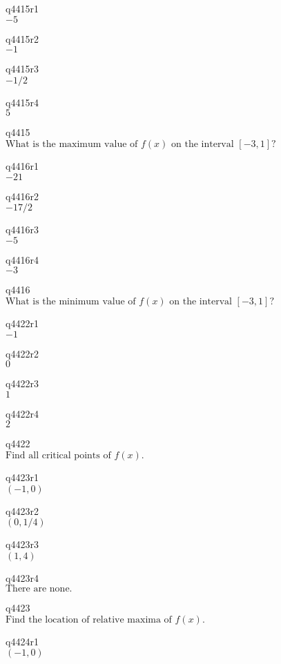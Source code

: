 q4415r1\\
\(\displaystyle -5 \)

q4415r2\\
\(\displaystyle -1 \)

q4415r3\\
\(\displaystyle -1/2 \)

q4415r4\\
\(\displaystyle 5 \)

q4415\\
\(\displaystyle \text{What is the maximum value of } f(x) \text{ on the interval } [-3, 1]? \)

q4416r1\\
\(\displaystyle -21 \)

q4416r2\\
\(\displaystyle -17/2 \)

q4416r3\\
\(\displaystyle -5 \)

q4416r4\\
\(\displaystyle -3 \)

q4416\\
\(\displaystyle \text{What is the minimum value of } f(x) \text{ on the interval } [-3, 1]? \)

q4422r1\\
\(\displaystyle -1 \)

q4422r2\\
\(\displaystyle 0 \)

q4422r3\\
\(\displaystyle 1 \)

q4422r4\\
\(\displaystyle 2 \)

q4422\\
\(\displaystyle \text{Find all critical points of } f(x). \)

q4423r1\\
\(\displaystyle (-1, 0) \)

q4423r2\\
\(\displaystyle (0, 1/4) \)

q4423r3\\
\(\displaystyle (1, 4) \)

q4423r4\\
\(\displaystyle \text{There are none.} \)

q4423\\
\(\displaystyle \text{Find the location of relative maxima of } f(x). \)

q4424r1\\
\(\displaystyle (-1, 0) \)

